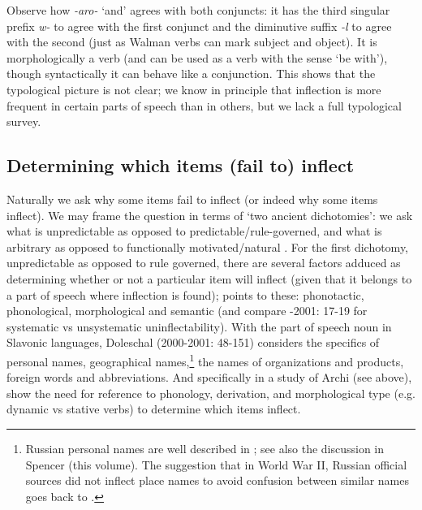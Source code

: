 \documentclass[output=paper]{langscibook}
\begin{document}
Observe how \textit{{}-aro-} ‘and’ agrees with both conjuncts: it has the third singular prefix \textit{w-} to agree with the first conjunct and the diminutive suffix \textit{{}-l} to agree with the second (just as Walman verbs can mark subject and object). It is morphologically a verb (and can be used as a verb with the sense ‘be with’), though syntactically it can behave like a conjunction. This shows that the typological picture is not clear; we know in principle that inflection is more frequent in certain parts of speech than in others, but we lack a full typological survey.

\subsection{\textbf{Determining} \textbf{which} \textbf{items} \textbf{(fail} \textbf{to)} \textbf{inflect}}

Naturally we ask why some items fail to inflect (or indeed why some items inflect). We may frame the question in terms of ‘two ancient dichotomies’: we ask what is unpredictable as opposed to predictable/rule-governed, and what is arbitrary as opposed to functionally motivated/natural \citep[107]{Bye2015}. For the first dichotomy, unpredictable as opposed to rule governed, there are several factors adduced as determining whether or not a particular item will inflect (given that it belongs to a part of speech where inflection is found); \citet{Fedden2019} points to these: phonotactic, phonological, morphological and semantic (and compare \citealt{Doleschal2000}-2001: 17-19 for systematic vs unsystematic uninflectability). With the part of speech noun in Slavonic languages, Doleschal (2000-2001: 48-151) considers the specifics of personal names, geographical names,\footnote{ \textrm{Russian personal names are well described in \citet[153-158]{Timberlake2004}; see also the discussion in Spencer (this volume). The suggestion that in World War II, Russian official sources did not inflect place names to avoid confusion between similar names goes back to \citet[105]{Mirtov1953}.} } the names of organizations and products, foreign words and abbreviations. And specifically in a study of Archi (see  above), \citet{ChumakinaCorbett2015} show the need for reference to phonology, derivation, and morphological type (e.g. dynamic vs stative verbs) to determine which items inflect. 
\end{document}

